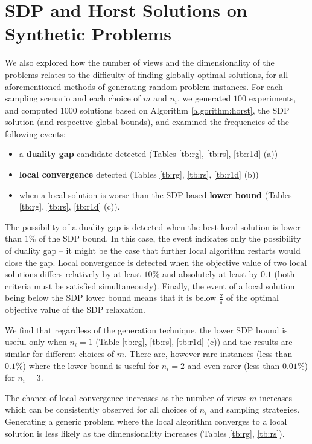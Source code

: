 \section{SDP and Horst Solutions on Synthetic Problems}\label{chap:experiments:horst}

We also explored how the number of views and the dimensionality of
the problems relates to the difficulty of finding globally optimal
solutions, for all aforementioned methods of generating random problem
instances.
 For each sampling scenario and each choice of $m$ and $n_i$, we generated $100$
experiments, and computed $1000$ solutions based on Algorithm
\ref{algorithm:horst}, the SDP solution (and respective
global bounds), and examined the frequencies of the following
events:
\begin{itemize}
\item a \textbf{duality gap} candidate detected (Tables
\ref{tb:rg}, \ref{tb:rs}, \ref{tb:r1d} (a))
\item \textbf{local convergence} detected (Tables \ref{tb:rg}, \ref{tb:rs},
\ref{tb:r1d} (b))
\item when a local solution is worse
than the SDP-based \textbf{lower bound} (Tables \ref{tb:rg},
\ref{tb:rs}, \ref{tb:r1d} (c)).
\end{itemize}
The possibility of a duality gap is
detected when the best local solution is lower than $1\%$ of the
SDP bound. In this case, the event indicates only the possibility
of duality gap -- it might be the case that further local
algorithm restarts would close the gap. Local convergence
is detected when the objective value of two local solutions
differs relatively by at least $10\%$ and absolutely at least by
$0.1$ (both criteria must be satisfied
simultaneously). Finally, the event of a local solution being
below the SDP lower bound means that it is below
$\frac{2}{\pi}$ of the optimal objective value of the SDP
relaxation.

We find that regardless of the generation technique, the lower
SDP bound is useful only when $n_i = 1$ (Table \ref{tb:rg},
\ref{tb:rs}, \ref{tb:r1d} (c)) and the results are similar for
different choices of $m$. There are, however rare instances (less
than $0.1\%$) where the lower bound is useful for $n_i = 2$ and
even rarer (less than $0.01\%$) for $n_i = 3$.

The chance of local convergence increases as the number of views
$m$ increases which can be consistently observed for all choices
of $n_i$ and sampling strategies. Generating a generic  problem where the
local algorithm  converges to a local solution is less
likely as the dimensionality increases
(Tables \ref{tb:rg}, \ref{tb:rs}).

